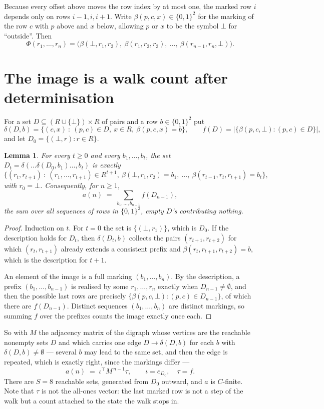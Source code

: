 \documentclass[11pt,a4paper]{article}
\theoremstyle{plain}
\newtheorem{lemma}[theorem]{Lemma}
\theoremstyle{definition}
\begin{document}
Because every offset above moves the row index by at most one, the marked row $i$ depends only
on rows $i-1,i,i+1$. Write $\beta(p,c,x)\in\{0,1\}^{2}$ for the marking of the row $c$
with $p$ above and $x$ below, allowing $p$ or $x$ to be the symbol $\bot$ for ``outside''.
Then
\[
\Phi(r_1,\dots,r_n)=\bigl(\beta(\bot,r_1,r_2),\ \beta(r_1,r_2,r_3),\ \dots,\
\beta(r_{n-1},r_n,\bot)\bigr).
\]

\section{The image is a walk count after determinisation}

For a set $D\subseteq(R\cup\{\bot\})\times R$ of pairs and a row $b\in\{0,1\}^{2}$ put
\[
\delta(D,b)=\{(c,x)\ :\ (p,c)\in D,\ x\in R,\ \beta(p,c,x)=b\},\qquad
f(D)=\bigl|\{\beta(p,c,\bot):(p,c)\in D\}\bigr| ,
\]
and let $D_0=\{(\bot,r):r\in R\}$.

\begin{lemma}\label{lem:det}
For every $t\ge0$ and every $b_1,\dots,b_t$, the set
$D_t=\delta(\dots\delta(D_0,b_1)\dots,b_t)$ is exactly
\[
\{(r_t,r_{t+1})\ :\ (r_1,\dots,r_{t+1})\in R^{t+1},\ \beta(\bot,r_1,r_2)=b_1,\ \dots,\
\beta(r_{t-1},r_t,r_{t+1})=b_t\} ,
\]
with $r_0=\bot$. Consequently, for $n\ge1$,
\[
a(n)\;=\;\sum_{b_1,\dots,b_{n-1}}f(D_{n-1}),
\]
the sum over all sequences of rows in $\{0,1\}^{2}$, empty $D$'s contributing nothing.
\end{lemma}

\begin{proof}
Induction on $t$. For $t=0$ the set is $\{(\bot,r_1)\}$, which is $D_0$. If the description
holds for $D_t$, then $\delta(D_t,b)$ collects the pairs $(r_{t+1},r_{t+2})$ for which
$(r_t,r_{t+1})$ already extends a consistent prefix and
$\beta(r_t,r_{t+1},r_{t+2})=b$, which is the description for $t+1$.

An element of the image is a full marking $(b_1,\dots,b_n)$. By the description, a prefix
$(b_1,\dots,b_{n-1})$ is realised by some $r_1,\dots,r_n$ exactly when $D_{n-1}\neq
\emptyset$, and then the possible last rows are precisely
$\{\beta(p,c,\bot):(p,c)\in D_{n-1}\}$, of which there are $f(D_{n-1})$. Distinct
sequences $(b_1,\dots,b_n)$ are distinct markings, so summing $f$ over the prefixes counts the
image exactly once each.
\end{proof}

So with $M$ the adjacency matrix of the digraph whose vertices are the reachable nonempty sets
$D$ and which carries one edge $D\to\delta(D,b)$ for each $b$ with $\delta(D,b)\neq\emptyset$
--- several $b$ may lead to the same set, and then the edge is repeated, which is exactly
right, since the markings differ ---
\[
a(n)\;=\;\iota^{\!\top}M^{\,n-1}\tau,\qquad \iota=e_{D_0},\quad \tau=f .
\]
There are $S=8$ reachable sets, generated from $D_0$ outward, and $a$ is $C$-finite. Note
that $\tau$ is not the all-ones vector: the last marked row is not a step of the walk but a
count attached to the state the walk stops in.
\end{document}
